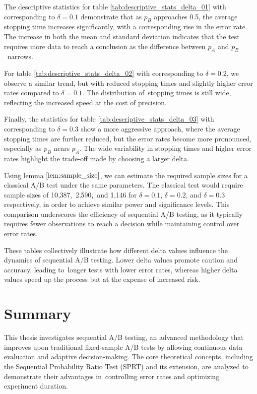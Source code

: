 \documentclass[magisterska, english]{pwr_wmat_praca_dyplomowa}
\theoremstyle{plain}
\numberwithin{theorem}{chapter}
\theoremstyle{definition}
\numberwithin{theorem}{chapter}
\begin{document}
The descriptive statistics for table \ref{tab:descriptive_stats_delta_01} with corresponding to \(\delta = 0.1\) demonstrate that as \( p_B \) approaches 0.5, the average stopping time increases significantly, with a corresponding rise in the error rate. The increase in both the mean and standard deviation indicates that the test requires more data to reach a conclusion as the difference between \( p_A \) and \( p_B \)~narrows.

For table \ref{tab:descriptive_stats_delta_02} with corresponding to \(\delta = 0.2\), we observe a similar trend, but with reduced stopping times and slightly higher error rates compared to \( \delta = 0.1 \). The distribution of~stopping times is still wide, reflecting the increased speed at the cost of precision.

Finally, the statistics for table \ref{tab:descriptive_stats_delta_03} with corresponding to \(\delta = 0.3\) show a more aggressive approach, where the average stopping times are further reduced, but the error rates become more pronounced, especially as \( p_B \) nears \( p_A \). The wide variability in stopping times and higher error rates highlight the trade-off made by choosing a larger delta.

Using lemma \(\ref{lem:sample_size}\), we can estimate the required sample sizes for a classical A/B test under the same parameters. The classical test would require sample sizes of 10,387,~2,590,~and 1,146 for \( \delta = 0.1 \), \( \delta = 0.2 \), and \( \delta = 0.3 \) respectively, in order to achieve similar power and significance levels. This comparison underscores the efficiency of sequential A/B testing, as it typically requires fewer observations to reach a decision while maintaining control over error rates.

These tables collectively illustrate how different delta values influence the dynamics of sequential A/B testing. Lower delta values promote caution and accuracy, leading to~longer tests with lower error rates, whereas higher delta values speed up the process but at the expense of increased risk.

{\backmatter \chapter{Summary}}

This thesis investigates sequential A/B testing, an advanced methodology that improves upon traditional fixed-sample A/B tests by allowing continuous data evaluation and adaptive decision-making. The core theoretical concepts, including the Sequential Probability Ratio Test (SPRT) and its extension, are analyzed to demonstrate their advantages in~controlling error rates and optimizing experiment duration.
\end{document}
